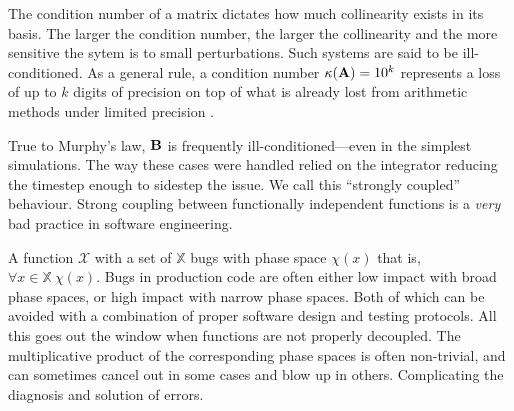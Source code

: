 The condition number of a matrix dictates how much collinearity exists in its basis. The larger the condition number, the larger the collinearity and the more sensitive the sytem is to small perturbations. Such systems are said to be ill-conditioned. As a general rule, a condition number $\kappa(\mathbf{A}) = 10^k$ represents a loss of up to $k$ digits of precision on top of what is already lost from arithmetic methods under limited precision \cite{cheney2012numerical}.

True to Murphy's law, $\mathbf{B}$ is frequently ill-conditioned---even in the simplest simulations. The way these cases were handled relied on the integrator reducing the timestep enough to sidestep the issue. We call this ``strongly coupled'' behaviour. Strong coupling between functionally independent functions is a \emph{very} bad practice in software engineering.

A function $\mathcal{X}$ with a set of $\mathbb{X}$ bugs with phase space $\chi(x)$ that is, $\forall x \in \mathbb{X}~ \chi(x)$. Bugs in production code are often either low impact with broad phase spaces, or high impact with narrow phase spaces. Both of which can be avoided with a combination of proper software design and testing protocols. All this goes out the window when functions are not properly decoupled. The multiplicative product of the corresponding phase spaces is often non-trivial, and can sometimes cancel out in some cases and blow up in others. Complicating the diagnosis and solution of errors.

